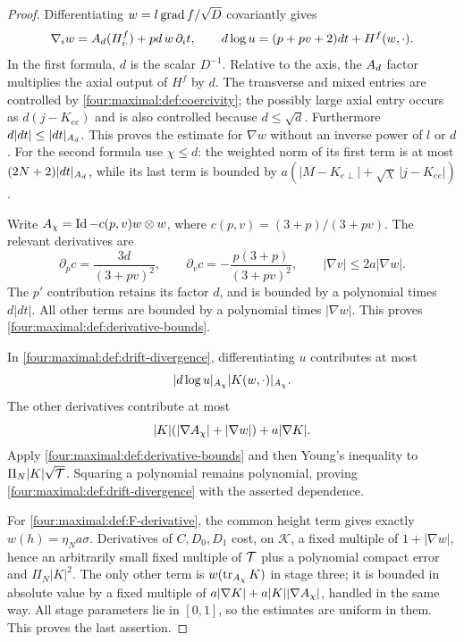 \begin{proof}
Differentiating $w=l\operatorname{grad} f/\sqrt D$ covariantly gives
\begin{equation}\label{four:maximal:def:w-derivative-exact}
 \nabla_iw=A_d(H^f_{i\cdot})+pd\,w\,\partial_i t,
 \qquad
 d\log u=(p+pv+2)dt+H^f(w,\cdot).
\end{equation}
In the first formula, $d$ is the scalar $D^{-1}$.  Relative to the axis,
the $A_d$ factor multiplies the axial output of $H^f$ by $d$.
The transverse and mixed entries are controlled by
\eqref{four:maximal:def:coercivity}; the possibly large axial entry occurs as
$d(j-K_{ee})$ and is also controlled because $d\le\sqrt d$.
Furthermore $d|dt|\le|dt|_{A_d}$.  This proves the estimate for
$\nabla w$ without an inverse power of $l$ or $d$.
For the second formula use $\chi\le d$: the weighted norm of its first
term is at most $(2N+2)|dt|_{A_d}$, while its last term is bounded by
$a(|M-K_{e\perp}|+\sqrt\chi\,|j-K_{ee}|)$.

Write $A_\chi=\operatorname{Id}-c(p,v)w\otimes w$, where
$c(p,v)=(3+p)/(3+pv)$.  The relevant derivatives are
\[
 \partial_pc=\frac{3d}{(3+pv)^2},\qquad
 \partial_vc=-\frac{p(3+p)}{(3+pv)^2},\qquad
 |\nabla v|\le2a|\nabla w|.
\]
The $p'$ contribution retains its factor $d$, and is bounded by a
polynomial times $d|dt|$.  All other terms are bounded by a polynomial
times $|\nabla w|$.  This proves \eqref{four:maximal:def:derivative-bounds}.

In \eqref{four:maximal:def:drift-divergence}, differentiating $u$ contributes at most
\[
 |d\log u|_{A_\chi}|K(w,\cdot)|_{A_\chi}.
\]
The other derivatives contribute at most
\[
 |K|(|\nabla A_\chi|+|\nabla w|)+a|\nabla K|.
\]
Apply \eqref{four:maximal:def:derivative-bounds} and then Young's inequality to
$\Pi_N|K|\sqrt{\mathcal T}$.  Squaring a polynomial remains polynomial, proving
\eqref{four:maximal:def:drift-divergence} with the asserted dependence.

For \eqref{four:maximal:def:F-derivative}, the common height term gives exactly
$w(h)=\eta_N a\sigma$.  Derivatives of $C,D_0,D_1$ cost, on $\mathcal K$,
a fixed multiple of $1+|\nabla w|$, hence an arbitrarily small fixed
multiple of $\mathcal T$ plus a polynomial compact error and $\Pi_N|K|^2$.
The only other term is $w(\operatorname{tr}_{A_\chi}K)$ in stage three; it is bounded
in absolute value by a fixed multiple of
$a|\nabla K|+a|K||\nabla A_\chi|$, handled in the same way.
All stage parameters lie in $[0,1]$, so the estimates are uniform in
them.  This proves the last assertion.
\end{proof}

